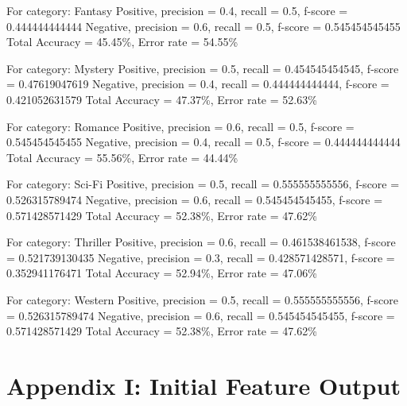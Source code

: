 \documentclass{article}
\begin{document}
For category: Fantasy
Positive, precision = 0.4, recall = 0.5, f-score = 0.444444444444 
Negative, precision = 0.6, recall = 0.5, f-score = 0.545454545455 
Total Accuracy = 45.45\%, Error rate = 54.55\%

For category: Mystery
Positive, precision = 0.5, recall = 0.454545454545, f-score = 0.47619047619 
Negative, precision = 0.4, recall = 0.444444444444, f-score = 0.421052631579 
Total Accuracy = 47.37\%, Error rate = 52.63\%

For category: Romance
Positive, precision = 0.6, recall = 0.5, f-score = 0.545454545455 
Negative, precision = 0.4, recall = 0.5, f-score = 0.444444444444 
Total Accuracy = 55.56\%, Error rate = 44.44\%

For category: Sci-Fi
Positive, precision = 0.5, recall = 0.555555555556, f-score = 0.526315789474 
Negative, precision = 0.6, recall = 0.545454545455, f-score = 0.571428571429 
Total Accuracy = 52.38\%, Error rate = 47.62\%

For category: Thriller
Positive, precision = 0.6, recall = 0.461538461538, f-score = 0.521739130435 
Negative, precision = 0.3, recall = 0.428571428571, f-score = 0.352941176471 
Total Accuracy = 52.94\%, Error rate = 47.06\%

For category: Western
Positive, precision = 0.5, recall = 0.555555555556, f-score = 0.526315789474 
Negative, precision = 0.6, recall = 0.545454545455, f-score = 0.571428571429 
Total Accuracy = 52.38\%, Error rate = 47.62\%

\section{Appendix I: Initial Feature Output}
\end{document}

